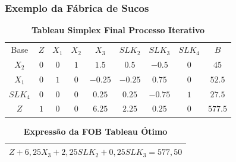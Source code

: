 \documentclass{beamer}
\begin{document}
\begin{frame}
	\frametitle{Exemplo da Fábrica de Sucos}
	\begin{table}
		\scriptsize
		\caption{{\textbf{Tableau Simplex Final Processo Iterativo}}}
		\begin{tabular}{c c c c c c c c c}
			\cellcolor{blue} {\color{white} Base} &
			\cellcolor{blue} {\color{white} $Z$} &
			\cellcolor{blue} {\color{white} $X_1$} &
			\cellcolor{blue} {\color{red} $X_2$} &
			\cellcolor{blue} {\color{red} $X_3$} &
			\cellcolor{blue} {\color{white} $SLK_2$} &
			\cellcolor{blue} {\color{white} $SLK_3$} &
			\cellcolor{blue} {\color{red} $SLK_4$} &
			\cellcolor{blue} {\color{white} $B$} \\
			\cellcolor{blue} {\color{red} $X_2$} &
			\cellcolor{yellow} $0$& 
			\cellcolor{yellow} $0$& 
			\cellcolor{yellow} $1$& 
			\cellcolor{yellow} $1.5$& 
			\cellcolor{yellow} $0.5$& 
			\cellcolor{yellow} $-0.5$& 
			\cellcolor{yellow} $0$&
			\cellcolor{yellow} $45$\\
			\cellcolor{blue} {\color{red} $X_1$} &
			\cellcolor{yellow} $0$& 
			\cellcolor{yellow} $1$& 
			\cellcolor{yellow} $0$& 
			\cellcolor{yellow} $-0.25$& 
			\cellcolor{yellow} $-0.25$& 
			\cellcolor{yellow} $0.75$& 
			\cellcolor{yellow} $0$&
			\cellcolor{yellow} $52.5$\\
			\cellcolor{blue} {\color{red} $SLK_4$} &
			\cellcolor{yellow} $0$& 
			\cellcolor{yellow} $0$& 
			\cellcolor{yellow} $0$& 
			\cellcolor{yellow} $0.25$& 
			\cellcolor{yellow} $0.25$& 
			\cellcolor{yellow} $-0.75$& 
			\cellcolor{yellow} $1$&
			\cellcolor{yellow} $27.5$\\
			\cellcolor{blue} {\color{white} $Z$} &
			\cellcolor{yellow} $1$& 
			\cellcolor{yellow} $0$& 
			\cellcolor{yellow} $0$& 
			\cellcolor{green} $6.25$& 
			\cellcolor{yellow} $2.25$& 
			\cellcolor{yellow} $0.25$& 
			\cellcolor{yellow} $0$&
			\cellcolor{yellow} $577.5$\\
		\end{tabular}
	\end{table} 
	
	\begin{table}
		\scriptsize
		\caption{\textbf{Expressão da FOB Tableau Ótimo}}
		\begin{tabular}{| c |}
			\hline
			\cellcolor{gray!50} $ Z + 6,25X_3 + 2,25SLK_2 + 0,25SLK_3 = 577,50$ \\
			\hline
		\end{tabular}
	\end{table} \pause


\end{frame}
\end{document}
